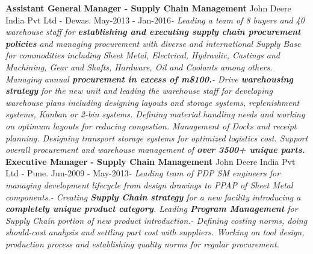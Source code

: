 \documentclass[11pt, a4paper]{awesome-cv}
\begin{document}
\newline \vspace{2mm} \newline
\textbf{Assistant General Manager - Supply Chain Management} \hfill John
Deere India Pvt Ltd - Dewas\newline . \hfill May-2013 -
Jan-2016\newline \textit{- \hspace{5mm}  Leading a team of 8 buyers and 40 warehouse staff for \textbf{establishing and executing supply chain procurement policies} and managing procurement with diverse and international Supply Base for commodities including Sheet Metal, Electrical, Hydraulic, Castings and Machining, Gear and Shafts, Hardware, Oil and Coolants among others. Managing annual \textbf{procurement in excess of m\$100.}\newline - \hspace{5mm}  Drive \textbf{warehousing strategy} for the new unit and leading the warehouse staff for developing warehouse plans including designing layouts and storage systems, replenishment systems, Kanban or 2-bin systems. Defining material handling needs and working on optimum layouts for reducing congestion. Management of Docks and receipt planning. Designing transport storage systems for optimized logistics cost. Support overall procurement and warehouse management of \textbf{over 3500+ unique parts.}}
\newline \vspace{2mm} \newline
\textbf{Executive Manager - Supply Chain Management} \hfill John Deere
India Pvt Ltd - Pune\newline . \hfill Jun-2009 -
May-2013\newline \textit{- \hspace{5mm}  Leading team of PDP SM engineers for managing development lifecycle from design drawings to PPAP of Sheet Metal components.\newline - \hspace{5mm}  Creating \textbf{Supply Chain strategy} for a new facility introducing a \textbf{completely unique product category}. Leading \textbf{Program Management} for Supply Chain portion of new product introduction.\newline - \hspace{5mm}  Defining costing norms, doing should-cost analysis and settling part cost with suppliers. Working on tool design, production process and establishing quality norms for regular procurement.}
\end{document}
